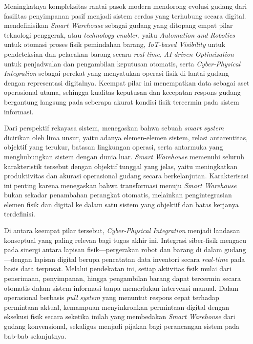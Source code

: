 Meningkatnya kompleksitas rantai pasok modern mendorong evolusi gudang dari fasilitas penyimpanan pasif menjadi sistem cerdas yang terhubung secara digital. \textcite{vangeest2021} mendefinisikan \textit{Smart Warehouse} sebagai gudang yang ditopang empat pilar teknologi penggerak, atau \textit{technology enabler}, yaitu \textit{Automation and Robotics} untuk otomasi proses fisik pemindahan barang, \textit{IoT-based Visibility} untuk pendeteksian dan pelacakan barang secara \textit{real-time}, \textit{AI-driven Optimization} untuk penjadwalan dan pengambilan keputusan otomatis, serta \textit{Cyber-Physical Integration} sebagai perekat yang menyatukan operasi fisik di lantai gudang dengan representasi digitalnya. Keempat pilar ini menempatkan data sebagai aset operasional utama, sehingga kualitas keputusan dan kecepatan respons gudang bergantung langsung pada seberapa akurat kondisi fisik tercermin pada sistem informasi.

Dari perspektif rekayasa sistem, \textcite{romero2020} menegaskan bahwa sebuah \textit{smart system} dicirikan oleh lima unsur, yaitu adanya elemen-elemen sistem, relasi antarentitas, objektif yang terukur, batasan lingkungan operasi, serta antarmuka yang menghubungkan sistem dengan dunia luar. \textit{Smart Warehouse} memenuhi seluruh karakteristik tersebut dengan objektif tunggal yang jelas, yaitu meningkatkan produktivitas dan akurasi operasional gudang secara berkelanjutan. Karakterisasi ini penting karena menegaskan bahwa transformasi menuju \textit{Smart Warehouse} bukan sekadar penambahan perangkat otomatis, melainkan pengintegrasian elemen fisik dan digital ke dalam satu sistem yang objektif dan batas kerjanya terdefinisi.

Di antara keempat pilar tersebut, \textit{Cyber-Physical Integration} menjadi landasan konseptual yang paling relevan bagi tugas akhir ini. Integrasi siber-fisik mengacu pada sinergi antara lapisan fisik---pergerakan robot dan barang di dalam gudang---dengan lapisan digital berupa pencatatan data inventori secara \textit{real-time} pada basis data terpusat. Melalui pendekatan ini, setiap aktivitas fisik mulai dari penerimaan, penyimpanan, hingga pengambilan barang dapat tercermin secara otomatis dalam sistem informasi tanpa memerlukan intervensi manual. Dalam operasional berbasis \textit{pull system} yang menuntut respons cepat terhadap permintaan aktual, kemampuan menyinkronkan permintaan digital dengan eksekusi fisik secara seketika inilah yang membedakan \textit{Smart Warehouse} dari gudang konvensional, sekaligus menjadi pijakan bagi perancangan sistem pada bab-bab selanjutnya.

